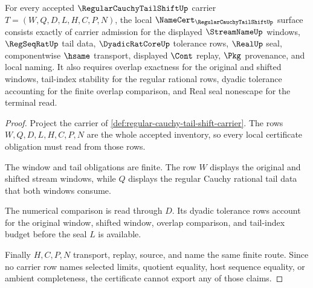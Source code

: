 \begin{theorem}
\label{thm:regular-cauchy-tail-shift-namecert-obligations}
For every accepted $\RegularCauchyTailShiftUp$ carrier $T=(W,Q,D,L,H,C,P,N)$, the local $\NameCert_{\RegularCauchyTailShiftUp}$ surface consists exactly of carrier admission for the displayed $\StreamNameUp$ windows, $\RegSeqRatUp$ tail data, $\DyadicRatCoreUp$ tolerance rows, $\RealUp$ seal, componentwise $\hsame$ transport, displayed $\Cont$ replay, $\Pkg$ provenance, and local naming. It also requires overlap exactness for the original and shifted windows, tail-index stability for the regular rational rows, dyadic tolerance accounting for the finite overlap comparison, and Real seal nonescape for the terminal read.
\end{theorem}
\begin{proof}
Project the carrier of \autoref{def:regular-cauchy-tail-shift-carrier}. The rows $W,Q,D,L,H,C,P,N$ are the whole accepted inventory, so every local certificate obligation must read from those rows.

The window and tail obligations are finite. The row $W$ displays the original and shifted stream windows, while $Q$ displays the regular Cauchy rational tail data that both windows consume.

The numerical comparison is read through $D$. Its dyadic tolerance rows account for the original window, shifted window, overlap comparison, and tail-index budget before the seal $L$ is available.

Finally $H,C,P,N$ transport, replay, source, and name the same finite route. Since no carrier row names selected limits, quotient equality, host sequence equality, or ambient completeness, the certificate cannot export any of those claims.
\end{proof}

